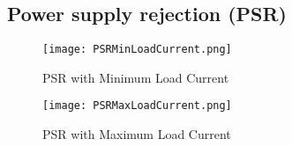 \documentclass{report}
\begin{document}
    \subsection{Power supply rejection (PSR)}

    \begin{figure}[ht!]
        \centering
        \begin{minipage}[b]{0.45\linewidth}
            \centering
            \texttt{[image: PSRMinLoadCurrent.png]}
            \caption{PSR with Minimum Load Current}
            \label{fig:PSRMinLoadCurrent}
        \end{minipage}
        \hfill
        \begin{minipage}[b]{0.45\linewidth}
            \centering
            \texttt{[image: PSRMaxLoadCurrent.png]}
            \caption{PSR with Maximum Load Current}
            \label{fig:PSRMaxLoadCurrent}
        \end{minipage}
    \end{figure}
\end{document}
